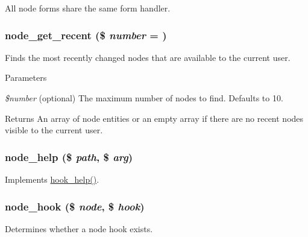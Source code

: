 All node forms share the same form handler. \hypertarget{node_8module_a10539626311cdc9670fc1e0337cd6a60}{
\subsubsection[{node\_\-get\_\-recent}]{\setlength{\rightskip}{0pt plus 5cm}node\_\-get\_\-recent (\$ {\em number} = {})}}
\label{node_8module_a10539626311cdc9670fc1e0337cd6a60}
Finds the most recently changed nodes that are available to the current user.


\begin{DoxyParams}{Parameters}
\item[{\em \$number}](optional) The maximum number of nodes to find. Defaults to 10.\end{DoxyParams}
\begin{DoxyReturn}{Returns}
An array of node entities or an empty array if there are no recent nodes visible to the current user. 
\end{DoxyReturn}
\hypertarget{node_8module_ad86b5b8d1b77f20fefbfe16b13419520}{
\subsubsection[{node\_\-help}]{\setlength{\rightskip}{0pt plus 5cm}node\_\-help (\$ {\em path}, \/  \$ {\em arg})}}
\label{node_8module_ad86b5b8d1b77f20fefbfe16b13419520}
Implements \hyperlink{group__hooks_ga5589c2714a782738e8851c4c90231f0e}{hook\_\-help()}. \hypertarget{node_8module_a5170e943f79e97ec35c73f178cc4068a}{
\subsubsection[{node\_\-hook}]{\setlength{\rightskip}{0pt plus 5cm}node\_\-hook (\$ {\em node}, \/  \$ {\em hook})}}
\label{node_8module_a5170e943f79e97ec35c73f178cc4068a}
Determines whether a node hook exists.


